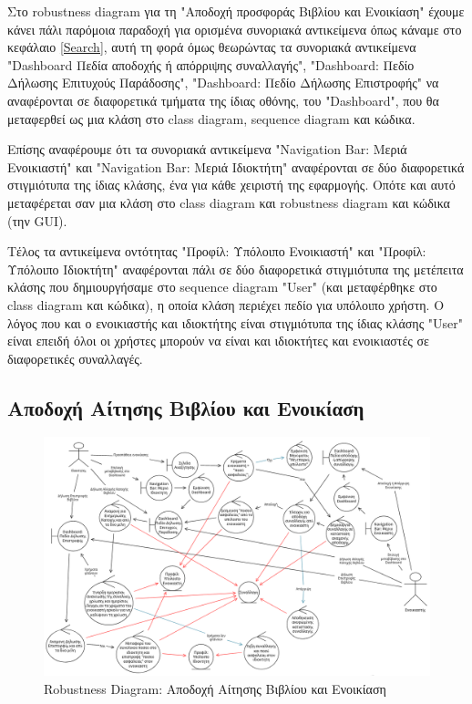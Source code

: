 \documentclass[12pt,a4paper]{article}
\begin{document}
Στο robustness diagram για τη "Αποδοχή προσφοράς Βιβλίου και Ενοικίαση" έχουμε κάνει πάλι παρόμοια παραδοχή για ορισμένα συνοριακά αντικείμενα όπως κάναμε στο κεφάλαιο \ref{Search}, αυτή τη φορά όμως θεωρώντας τα συνοριακά αντικείμενα "Dashboard Πεδία αποδοχής ή απόρριψης συναλλαγής", "Dashboard: Πεδίο Δήλωσης Επιτυχούς Παράδοσης", "Dashboard: Πεδίο Δήλωσης Επιστροφής" να αναφέρονται σε διαφορετικά τμήματα της ίδιας οθόνης, του "Dashboard", που θα μεταφερθεί ως μια κλάση στο class diagram, sequence diagram και κώδικα.

Επίσης αναφέρουμε ότι τα συνοριακά αντικείμενα "Navigation Bar: Μεριά Ενοικιαστή" και "Navigation Bar: Μεριά Ιδιοκτήτη" αναφέρονται σε δύο διαφορετικά στιγμιότυπα της ίδιας κλάσης, ένα για κάθε χειριστή της εφαρμογής. Οπότε και αυτό μεταφέρεται σαν μια κλάση στο class diagram και robustness diagram και κώδικα (την GUI).

Τέλος τα αντικείμενα οντότητας "Προφίλ: Υπόλοιπο Ενοικιαστή" και "Προφίλ: Υπόλοιπο Ιδιοκτήτη" αναφέρονται πάλι σε δύο διαφορετικά στιγμιότυπα της μετέπειτα κλάσης που δημιουργήσαμε στο sequence diagram "User" (και μεταφέρθηκε στο class diagram και κώδικα), η οποία κλάση περιέχει πεδίο για υπόλοιπο χρήστη. Ο λόγος που και ο ενοικιαστής και ιδιοκτήτης είναι στιγμιότυπα της ίδιας κλάσης "User" είναι επειδή όλοι οι χρήστες μπορούν να είναι και ιδιοκτήτες και ενοικιαστές σε διαφορετικές συναλλαγές.

\subsection{Αποδοχή Αίτησης Βιβλίου και Ενοικίαση}
\begin{figure}[H]
	\includegraphics[width=\textwidth]{Accept Request Offer and Rent Robustness.png}
	\caption{Robustness Diagram: Αποδοχή Αίτησης Βιβλίου και Ενοικίαση}
	\label{Robustness Diagram: Αποδοχή Αίτησης Βιβλίου και Ενοικίαση}
\end{figure}
\end{document}
